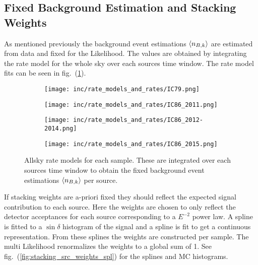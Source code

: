 \subsection{Fixed Background Estimation and Stacking Weights}
As mentioned previously the background event estimations $\braket{n_{B,k}}$ are estimated from data and fixed for the Likelihood.
The values are obtained by integrating the rate model for the whole sky over each sources time window.
The rate model fits can be seen in fig.~(\ref{fig:rate_allsky}).

\begin{figure}[htbp]
  \centering
  \begin{subfigure}[c]{0.49\textwidth}
    \texttt{[image: inc/rate\_models\_and\_rates/IC79.png]}
  \end{subfigure}
  \hfill
  \begin{subfigure}[c]{0.49\textwidth}
    \texttt{[image: inc/rate\_models\_and\_rates/IC86\_2011.png]}
  \end{subfigure}

  \begin{subfigure}[c]{0.49\textwidth}
    \texttt{[image: inc/rate\_models\_and\_rates/IC86\_2012-2014.png]}
  \end{subfigure}
  \hfill
  \begin{subfigure}[c]{0.49\textwidth}
    \texttt{[image: inc/rate\_models\_and\_rates/IC86\_2015.png]}
  \end{subfigure}

  \caption{Allsky rate models for each sample. These are integrated over each sources time window to obtain the fixed background event estimations $\braket{n_{B,k}}$ per source.}
  \label{fig:rate_allsky}
\end{figure}

If stacking weights are a-priori fixed they should reflect the expected signal contribution to each source.
Here the weights are chosen to only reflect the detector acceptances for each source corresponding to a $E^{-2}$ power law.
A spline is fitted to a $\sin\delta$ histogram of the signal and a spline is fit to get a continuous representation.
From these splines the weights are constructed per sample.
The multi Likelihood renormalizes the weights to a global sum of 1.
See fig.~(\ref{fig:stacking_src_weights_spl}) for the splines and MC histograms.


